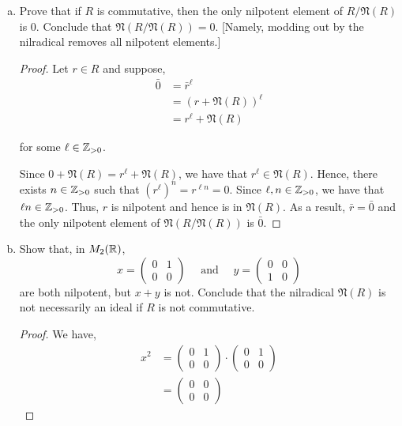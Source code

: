 \documentclass[11pt, reqno]{amsart}
\theoremstyle{plain}
\theoremstyle{definition}
\theoremstyle{example}
\def\fN{\mathfrak{N}}
\begin{document}
\begin{enumerate}[1.]
\begin{enumerate}[(a)]
\item Prove that if $R$ is commutative, then the only nilpotent element of $R/\fN(R)$ is 0. Conclude that $\fN(R/\fN(R)) = 0$. {[Namely, modding out by the nilradical removes all nilpotent elements.]}

\begin{proof}
Let $r \in R$ and suppose,
\begin{align*}
\bar{0} &= \bar{r}^{\ell}\\
&= (r + \fN(R))^{\ell}\\
&= r^{\ell} + \fN(R)
\end{align*}

for some $\ell \in \mathbb{Z}_{>0}$.

\par
Since $0 + \fN(R) = r^{\ell} + \fN(R)$, we have that $r^{\ell} \in \fN(R)$. Hence, there exists $n \in \mathbb{Z}_{> 0}$ such that $(r^{\ell})^n = r^{\ell n} = 0$. Since $\ell, n \in \mathbb{Z}_{> 0}$, we have that $\ell n \in \mathbb{Z}_{> 0}$. Thus, $r$ is nilpotent and hence is in $\fN(R)$. As a result, $\bar{r} = \bar{0}$ and the only nilpotent element of $\fN(R/\fN(R))$ is $\bar{0}$.
\end{proof}

\item Show that, in $M_2(\mathbb{R})$, 
$$x = \begin{pmatrix} 0 & 1 \\ 0 & 0 \end{pmatrix} \quad \text{ and } \quad y = \begin{pmatrix} 0 & 0 \\ 1 & 0 \end{pmatrix}$$
are both nilpotent, but $x + y$ is not. Conclude that the nilradical $\fN(R)$ is not necessarily an ideal if $R$ is not commutative.  

\begin{proof}
We have,
\begin{align*}
x^2 &= \begin{pmatrix} 0 & 1 \\ 0 & 0 \end{pmatrix} \cdot \begin{pmatrix} 0 & 1 \\ 0 & 0 \end{pmatrix} \\
&= \begin{pmatrix} 0 & 0 \\ 0 & 0 \end{pmatrix}
\end{align*}


\end{proof}
\end{enumerate}
\end{enumerate}
\end{document}
